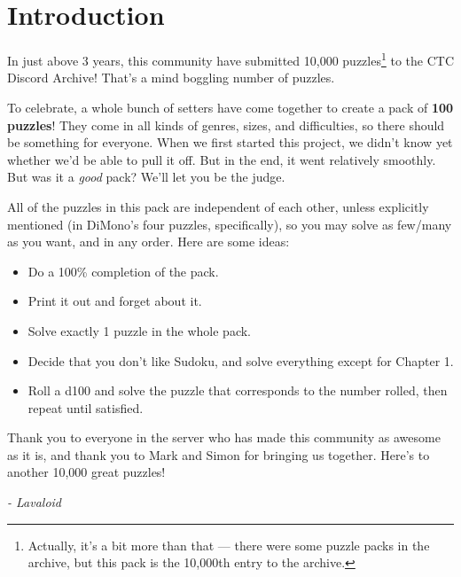 \chapter{Introduction}

In just above 3 years, this community have submitted 10,000 puzzles\footnote{Actually, it's a bit 
more than that --- there were some puzzle packs in the archive, but this pack is the 10,000th entry 
to the archive.} to the CTC Discord Archive! That's a mind boggling number of puzzles. 

To celebrate, a whole bunch of setters have come together to create a pack of \textbf{100 puzzles}! 
They come in all kinds of genres, sizes, and difficulties, so there should be something for everyone.
When we first started this project, we didn't know yet whether we'd be able to pull it off. But in
the end, it went relatively smoothly. But was it a \emph{good} pack? We'll let you be the judge.


All of the puzzles in this pack are independent of each other, unless explicitly mentioned (in DiMono's
four puzzles, specifically), so you may solve as few/many as you want, and in any order. Here are some ideas:
\begin{itemize}
  \item Do a 100\% completion of the pack.
  \item Print it out and forget about it.
  \item Solve exactly 1 puzzle in the whole pack.
  \item Decide that you don't like Sudoku, and solve everything except for Chapter 1.
  \item Roll a d100 and solve the puzzle that corresponds to the number rolled, then repeat until satisfied.
\end{itemize}

Thank you to everyone in the server who has made this community as awesome as it is, and thank you to Mark 
and Simon for bringing us together. Here's to another 10,000 great puzzles!

\vspace{2em}

\hfill \emph{- Lavaloid}
